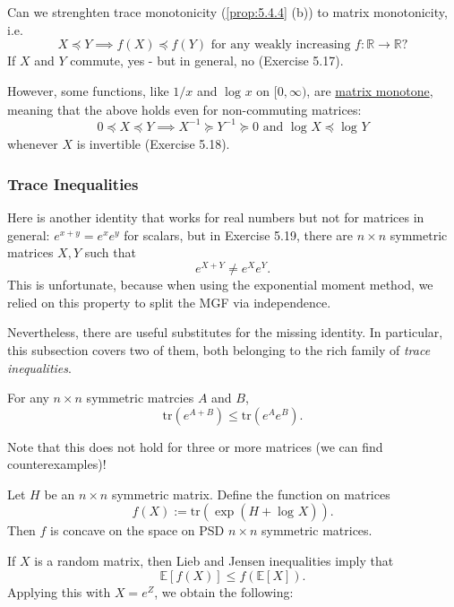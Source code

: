 \begin{remark}
\label{rmk:5.4.6}
Can we strenghten trace monotonicity (\cref{prop:5.4.4} (b)) to matrix monotonicity, i.e.
\[ X \preceq Y \implies f(X) \preceq f(Y) \text{ for any weakly increasing } f: \mathbb{R} \to \mathbb{R}? \]
If $X$ and $Y$ commute, yes - but in general, no (Exercise 5.17). 

However, some functions, like $1/x$ and $\log_{}{x}$ on $[0, \infty)$, are \underline{matrix monotone}, meaning 
that the above holds even for non-commuting matrices:
\[ 0 \preceq X \preceq Y \implies X^{-1} \succeq Y^{-1} \succeq 0 \text{ and } \log_{}{X} \preceq \log_{}{Y} \]
whenever $X$ is invertible (Exercise 5.18).
\end{remark}


\subsubsection{Trace Inequalities}
Here is another identity that works for real numbers but not for matrices in general: $e^{x + y} = e^x e^y$ for 
scalars, but in Exercise 5.19, there are $n \times n$ symmetric matrices $X, Y$ such that 
\[ e^{X + Y} \neq e^X e^Y. \]
This is unfortunate, because when using the exponential moment method, we relied on this property to split 
the MGF via independence. 

Nevertheless, there are useful substitutes for the missing identity. In particular, this subsection covers two 
of them, both belonging to the rich family of \textit{trace inequalities}.

\begin{theorem}
\label{thm:5.4.7}
For any $n \times n$ symmetric matrcies $A$ and $B$, 
\[ \mathrm{tr}(e^{A + B}) \leq \mathrm{tr}(e^A e^B). \]
\end{theorem}
Note that this does not hold for three or more matrices (we can find counterexamples)!

\begin{theorem}
\label{thm:5.4.8}
Let $H$ be an $n \times n$ symmetric matrix. Define the function on matrices 
\[ f(X) := \mathrm{tr}(\exp{(H + \log_{}{X})}). \]
Then $f$ is concave on the space on PSD $n \times n$ symmetric matrices.
\end{theorem}

If $X$ is a random matrix, then Lieb and Jensen inequalities imply that 
\[ \mathbb{E}[f(X)] \leq f(\mathbb{E}[X]). \]
Applying this with $X = e^Z$, we obtain the following:


